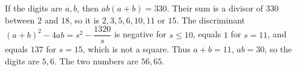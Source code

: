 If the digits are $a,b$, then $ab(a+b)=330$. Their sum is a divisor of $330$ between $2$ and $18$, so it is $2,3,5,6,10,11$ or $15$. The discriminant $(a+b)^2-4ab=s^2-\dfrac{1320}{s}$ is negative for $s\le10$, equals $1$ for $s=11$, and equals $137$ for $s=15$, which is not a square. Thus $a+b=11$, $ab=30$, so the digits are $5,6$. The two numbers are $\boxed{56,65}$.

